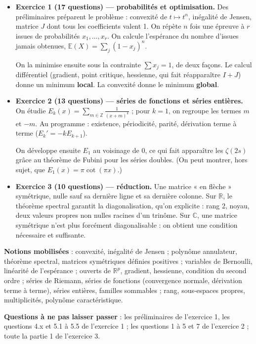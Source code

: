 \documentclass[11pt,a4paper]{article}
\begin{document}
\begin{itemize}
\item
  \textbf{Exercice 1 (17 questions) --- probabilités et optimisation.} Des préliminaires préparent le problème : convexité de \(t\mapsto t^n\), inégalité de Jensen, matrice \(J\) dont tous les coefficients valent 1. On répète \(n\) fois une épreuve à \(r\) issues de probabilités \(x_1,\dots,x_r\). On calcule l'espérance du nombre d'issues jamais obtenues, \(\mathbb E(X)=\sum_j(1-x_j)^n\).

  On la minimise ensuite sous la contrainte \(\sum x_j=1\), de deux façons. Le calcul différentiel (gradient, point critique, hessienne, qui fait réapparaître \(I+J\)) donne un minimum \textbf{local}. La convexité donne le minimum \textbf{global}.
\item
  \textbf{Exercice 2 (13 questions) --- séries de fonctions et séries entières.} On étudie \(E_k(x)=\sum_{m\in\mathbb Z}\frac1{(x+m)^k}\) ; pour \(k=1\), on regroupe les termes \(m\) et \(-m\). Au programme : existence, périodicité, parité, dérivation terme à terme (\(E_k'=-kE_{k+1}\)).

  On développe ensuite \(E_1\) au voisinage de \(0\), ce qui fait apparaître les \(\zeta(2s)\) grâce au théorème de Fubini pour les séries doubles. (On peut montrer, hors sujet, que \(E_1(x)=\pi\cot(\pi x)\).)
\item
  \textbf{Exercice 3 (10 questions) --- réduction.} Une matrice « en flèche » symétrique, nulle sauf sa dernière ligne et sa dernière colonne. Sur \(\mathbb R\), le théorème spectral garantit la diagonalisation, qu'on explicite : rang 2, noyau, deux valeurs propres non nulles racines d'un trinôme. Sur \(\mathbb C\), une matrice symétrique n'est plus forcément diagonalisable : on obtient une condition nécessaire et suffisante.
\end{itemize}

\textbf{Notions mobilisées} : convexité, inégalité de Jensen ; polynôme annulateur, théorème spectral, matrices symétriques définies positives ; variables de Bernoulli, linéarité de l'espérance ; ouverts de \(\mathbb R^p\), gradient, hessienne, condition du second ordre ; séries de Riemann, séries de fonctions (convergence normale, dérivation terme à terme), séries entières, familles sommables ; rang, sous-espaces propres, multiplicités, polynôme caractéristique.

\textbf{Questions à ne pas laisser passer} : les préliminaires de l'exercice 1, les questions 4.x et 5.1 à 5.5 de l'exercice 1 ; les questions 1 à 5 et 7 de l'exercice 2 ; toute la partie 1 de l'exercice 3.
\end{document}
